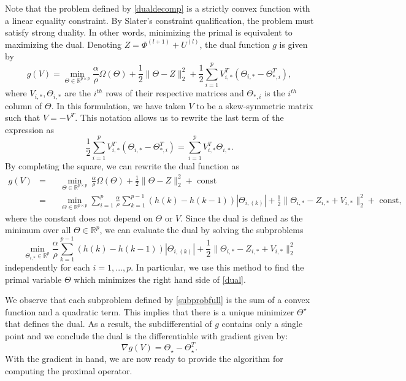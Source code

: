 \documentclass{uwstat572}
\theoremstyle{remark}
\theoremstyle{definition}
\begin{document}
Note that the problem defined by \eqref{dualdecomp} is a strictly convex function with a linear equality constraint.  By Slater's constraint qualification, the problem must satisfy strong duality.  In other words, minimizing the primal is equivalent to maximizing the dual.  Denoting $Z = \Phi^{(l+1)} + U^{(l)}$, the dual function $g$ is given by
\begin{equation}\label{dual}
g(V) = \min_{\Theta \in \mathbb{R}^{p \times p} } \frac{\alpha}{\rho} \Omega(\Theta) + \frac{1}{2} \| \Theta - Z \|_2^2 + \frac{1}{2}\sum_{i=1}^p V_{i,*}^T ( \Theta_{i,*} - \Theta_{*, i}^T),
\end{equation}
where $V_{i,*}, \Theta_{i,*}$ are the $i^{th}$ rows of their respective matrices and $\Theta_{*,i}$ is the $i^{th}$ column of $\Theta$.  In this formulation, we have taken $V$ to be a skew-symmetric matrix such that $V = - V^T$.  This notation allows us to rewrite the last term of the expression as
\begin{equation*}
\frac{1}{2}\sum_{i=1}^p V_{i,*}^T ( \Theta_{i,*} - \Theta_{*, i}^T) = \sum_{i=1}^p V_{i,*}^T \Theta_{i,*}.
\end{equation*}
By completing the square, we can rewrite the dual function as
\begin{equation*}
\begin{aligned}
g(V) &= && \min_{\Theta \in \mathbb{R}^{p \times p}} \, \frac{\alpha}{\rho} \Omega(\Theta) + \frac{1}{2} \| \Theta - Z \|_2^2 + {\text{ const}}
\\
&= && \min_{\Theta \in \mathbb{R}^{p \times p} } \sum_{i=1}^p \frac{\alpha}{\rho} \sum_{k=1}^{p-1} (h(k) - h(k-1)) |\Theta_{i,(k)}| + \frac{1}{2} \| \Theta_{i,*} - Z_{i,*} + V_{i,*} \|_2^2 + {\text{ const}},
\end{aligned}
\end{equation*}
where the constant does not depend on $\Theta$ or $V$.  Since the dual is defined as the minimum over all $\Theta \in \mathbb{R}^p$, we can evaluate the dual by solving the subproblems
\begin{equation}\label{subprobfull}
    \min_{\Theta_{i,*} \in \mathbb{R}^p} \frac{\alpha}{\rho} \sum_{k=1}^{p-1} (h(k) - h(k-1))|\Theta_{i,(k)}| + \frac{1}{2} \| \Theta_{i,*} - Z_{i,*} + V_{i,*} \|_2^2
\end{equation}
independently for each $i=1,...,p$.  In particular, we use this method to find the primal variable $\Theta$ which minimizes the right hand side of \eqref{dual}.

We observe that each subproblem defined by \eqref{subprobfull} is the sum of a convex function and a quadratic term.  This implies that there is a unique minimizer $\Theta^{\star}$ that defines the dual.  As a result, the subdifferential of $g$ contains only a single point and we conclude the dual is the differentiable with gradient given by:
\begin{equation}
\nabla g(V) = \Theta_{\star} - \Theta_{\star}^T.
\end{equation}
With the gradient in hand, we are now ready to provide the algorithm for computing the proximal operator.
\end{document}
